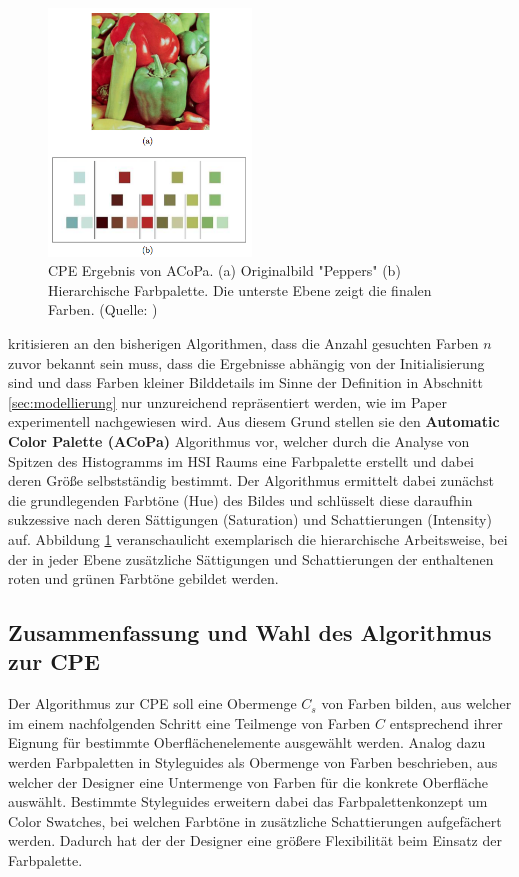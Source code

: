 \documentclass[11pt,a4paper,bibliography=totoc,twocolumn]{scrartcl}
\begin{document}
\begin{figure}[h]
\centering
\includegraphics[width=0.48\textwidth]{img/peppers.png}
\caption{CPE Ergebnis von ACoPa. (a) Originalbild "Peppers" (b) Hierarchische Farbpalette. Die unterste Ebene zeigt die finalen Farben. (Quelle: \citep{acopa})}
\label{fig:peppers}
\end{figure}

\citet{acopa} kritisieren an den bisherigen Algorithmen, dass die Anzahl gesuchten Farben $n$ zuvor bekannt sein muss, dass die Ergebnisse abhängig von der Initialisierung sind und dass Farben kleiner Bilddetails im Sinne der Definition in Abschnitt \ref{sec:modellierung} nur unzureichend repräsentiert werden, wie im Paper experimentell nachgewiesen wird. Aus diesem Grund stellen sie den \textbf{Automatic Color Palette (ACoPa)} Algorithmus vor, welcher durch die Analyse von Spitzen des Histogramms im HSI Raums eine Farbpalette erstellt und dabei deren Größe selbstständig bestimmt. Der Algorithmus ermittelt dabei zunächst die grundlegenden Farbtöne (Hue) des Bildes und schlüsselt diese daraufhin sukzessive nach deren Sättigungen (Saturation) und Schattierungen (Intensity) auf. Abbildung \ref{fig:peppers} veranschaulicht exemplarisch die hierarchische Arbeitsweise, bei der in jeder Ebene zusätzliche Sättigungen und Schattierungen der enthaltenen roten und grünen Farbtöne gebildet werden.

\subsection*{Zusammenfassung und Wahl des Algorithmus zur CPE}

Der Algorithmus zur CPE soll eine Obermenge $C_s$ von Farben bilden, aus welcher im einem nachfolgenden Schritt eine Teilmenge von Farben $C$ entsprechend ihrer Eignung für bestimmte Oberflächenelemente ausgewählt werden. Analog dazu werden Farbpaletten in Styleguides als Obermenge von Farben beschrieben, aus welcher der Designer eine Untermenge von Farben für die konkrete Oberfläche auswählt. Bestimmte Styleguides erweitern dabei das Farbpalettenkonzept um Color Swatches, bei welchen Farbtöne in zusätzliche Schattierungen aufgefächert werden. Dadurch hat der der Designer eine größere Flexibilität beim Einsatz der Farbpalette.
\end{document}
